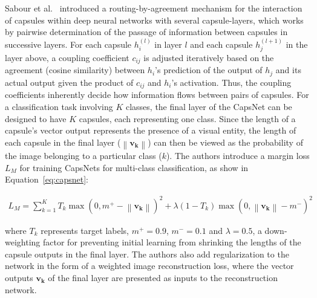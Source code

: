 Sabour et al.~\cite{bib:capsnet} introduced a routing-by-agreement mechanism for the interaction of capsules within deep neural networks with several capsule-layers, which works by pairwise determination of the passage of information between capsules in successive layers. For each capsule $h_i^{(l)}$ in layer $l$ and each capsule $h_j^{(l + 1)}$ in the layer above, a coupling coefficient $c_{ij}$ is adjusted iteratively based on the agreement (cosine similarity) between $h_i$'s prediction of the output of $h_j$ and its actual output given the product of $c_{ij}$ and $h_i$'s activation. Thus, the coupling coefficients inherently decide how information flows between pairs of capsules. For a classification task involving $K$ classes, the final layer of the CapsNet can be designed to have $K$ capsules, each representing one class. Since the length of a capsule's vector output represents the presence of a visual entity, the length of each capsule in the final layer ($\left\lVert \mathbf{v_k} \right\rVert$) can then be viewed as the probability of the image belonging to a particular class ($k$). The authors introduce a margin loss $L_M$ for training CapsNets for multi-class classification, as show in Equation~\ref{eq:capsnet}:

\begin{align}
\label{eq:capsnet}
L_M = \sum_{k=1}^{K} T_k \max (0, m^+ - \left\lVert \mathbf{v_k} \right\rVert)^2 + \lambda (1 - T_k) \max(0, \left\lVert \mathbf{v_k} \right\rVert - m^-)^2
\end{align}

where $T_k$ represents target labels, $m^+ = 0.9$, $m^- = 0.1$ and $\lambda = 0.5$, a down-weighting factor for preventing initial learning from shrinking the lengths of the capsule outputs in the final layer. The authors also add regularization to the network in the form of a weighted image reconstruction loss, where the vector outputs $\mathbf{v_k}$ of the final layer are presented as inputs to the reconstruction network.